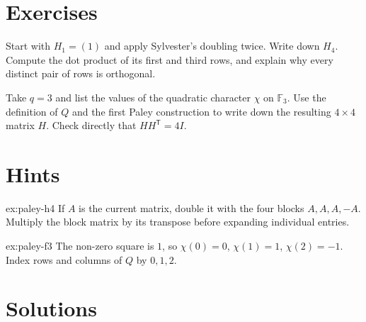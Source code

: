 \section{Exercises}

\begin{exercise}[$\star$]\label{ex:paley-h4}
Start with $H_1=(1)$ and apply Sylvester's doubling twice. Write down $H_4$. Compute the dot product of its first and third rows, and explain why every distinct pair of rows is orthogonal.
\end{exercise}

\begin{exercise}[$\star\star$]\label{ex:paley-f3}
Take $q=3$ and list the values of the quadratic character $\chi$ on $\mathbb F_3$. Use the definition of $Q$ and the first Paley construction to write down the resulting $4\times4$ matrix $H$. Check directly that $HH^{\mathsf T}=4I$.
\end{exercise}

\section{Hints}

\begin{hint}{ex:paley-h4}
If $A$ is the current matrix, double it with the four blocks $A,A,A,-A$. Multiply the block matrix by its transpose before expanding individual entries.
\end{hint}

\begin{hint}{ex:paley-f3}
The non-zero square is $1$, so $\chi(0)=0$, $\chi(1)=1$, $\chi(2)=-1$. Index rows and columns of $Q$ by $0,1,2$.
\end{hint}

\section{Solutions}

